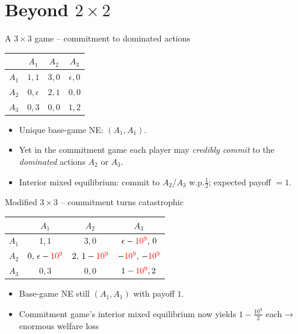 \documentclass[../slides.tex]{subfiles}
\begin{document}
\section{Beyond \texorpdfstring{$2\times2$}{2x2}}
\begin{frame}{A $3\times3$ game – commitment to dominated actions}
\centering
\renewcommand{\arraystretch}{1.25}
\begin{tabular}{c|ccc}
      & $A_1$ & $A_2$ & $A_3$ \\\hline
$A_1$ & $1,1$ & $3,0$   & $\epsilon,0$ \\
$A_2$ & $0,\epsilon$ & $2,1$ & $0,0$ \\
$A_3$ & $0,3$ & $0,0$   & $1,2$
\end{tabular}

\bigskip
\begin{itemize}
  \item Unique base-game NE: \((A_1,A_1)\).
  \item Yet in the commitment game each player may \emph{credibly commit}
        to the \emph{dominated} actions \(A_2\) or \(A_3\).  
  \item Interior mixed equilibrium: commit to \(A_2\)/\(A_3\) w.p.\(\tfrac12\); expected payoff \(=1\).
\end{itemize}
\end{frame}
\begin{frame}{Modified $3\times3$ – commitment turns catastrophic}
\centering
\renewcommand{\arraystretch}{1.25}
\begin{tabular}{c|ccc}
      & $A_1$ & $A_2$ & $A_3$ \\\hline
$A_1$ & $1,1$ & $3,0$ & $\epsilon-\textcolor{red}{10^{9}},\,0$ \\
$A_2$ & $0,\,\epsilon-\textcolor{red}{10^{9}}$
      & $2,\,1-\textcolor{red}{10^{9}}$
      & $-\textcolor{red}{10^{9}},\,-\textcolor{red}{10^{9}}$ \\
$A_3$ & $0,3$ & $0,0$
      & $1-\textcolor{red}{10^{9}}, 2$
\end{tabular}

\bigskip
\begin{itemize}
  \item Base-game NE still \((A_1,A_1)\) with payoff \(1\).
  \item Commitment game’s interior mixed equilibrium now yields
        \(\displaystyle 1-\frac{10^{9}}{2}\) each → enormous welfare loss
\end{itemize}
\end{frame}
\end{document}
